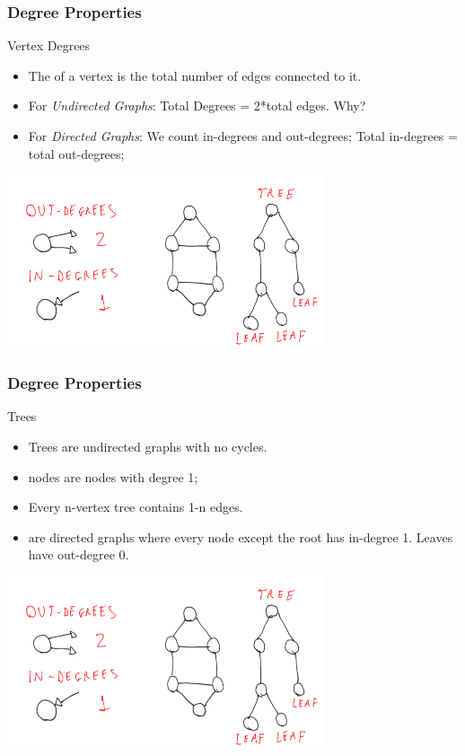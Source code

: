 \documentclass{beamer}
\begin{document}
\begin{frame}
  \frametitle{Degree Properties}
  {\small
  \begin{block}{Vertex Degrees}
    \begin{itemize}
    \item The  of a vertex is the total number of edges
      connected to it.
    \item For \emph{Undirected Graphs}: Total Degrees = 2*total edges. Why?
    \item For \emph{Directed Graphs}: We count in-degrees and
      out-degrees; Total in-degrees = total out-degrees;
    \end{itemize}
  \end{block}}
  \begin{center}
    \includegraphics[width=0.7\textwidth]{img/degrees1}
  \end{center}
\end{frame}

\begin{frame}
  \frametitle{Degree Properties}
  {\small
  \begin{block}{Trees}
    \begin{itemize}
    \item Trees are undirected graphs with no cycles.
    \item {} nodes are nodes with degree 1;
    \item Every n-vertex tree contains 1-n edges.
    \item {} are directed graphs where every
      node except the root has in-degree 1. Leaves have out-degree 0.
    \end{itemize}
  \end{block}}
  \begin{center}
    \includegraphics[width=0.7\textwidth]{img/degrees1}
  \end{center}
\end{frame}
\end{document}
